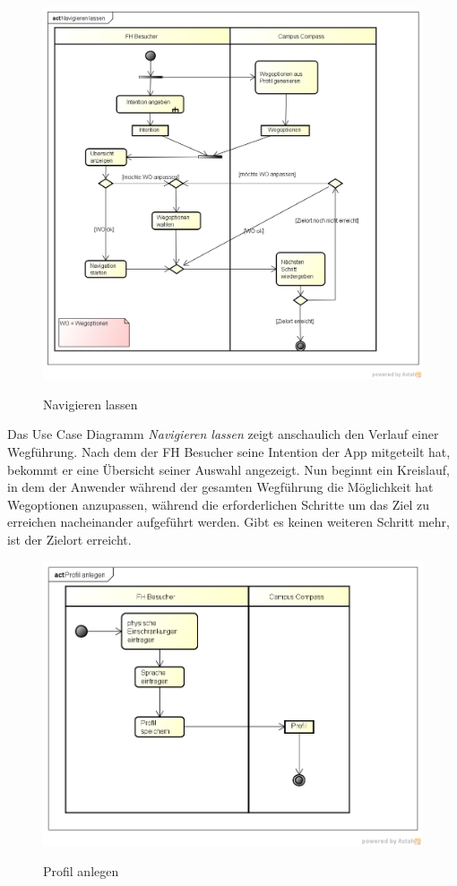 \begin{figure}[hbt]
  \centering
  \includegraphics[width=\linewidth]{img/akt_navigieren_lassen.png}
  \label{img:akt_navigieren_lassen}
  \caption{Navigieren lassen}
\end{figure}

Das Use Case Diagramm \emph{Navigieren lassen} zeigt anschaulich den Verlauf einer Wegführung. Nach dem der FH Besucher seine Intention der App mitgeteilt hat, bekommt er eine Übersicht seiner Auswahl angezeigt. Nun beginnt ein Kreislauf, in dem der Anwender während der gesamten Wegführung die Möglichkeit hat Wegoptionen anzupassen, während die erforderlichen Schritte um das Ziel zu erreichen nacheinander aufgeführt werden. Gibt es keinen weiteren Schritt mehr, ist der Zielort erreicht.

\begin{figure}[hbt]
  \centering
  \includegraphics[width=\linewidth]{img/akt_profil_anlegen.png}
  \label{img:akt_profil_anlegen}
  \caption{Profil anlegen}
\end{figure}

